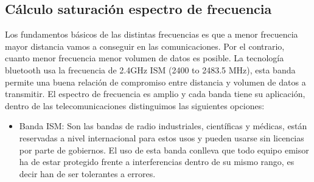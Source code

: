\documentclass[a4paper ,12pt, onecolumn]{article}
\begin{document}
    \subsection{Cálculo saturación espectro de frecuencia}
            Los fundamentos básicos de las distintas frecuencias es que a menor frecuencia mayor distancia vamos a conseguir 
            en las comunicaciones. Por el contrario, cuanto menor frecuencia menor volumen de datos es posible.
            La tecnología bluetooth usa la frecuencia de 2.4GHz ISM (2400 to 2483.5 MHz), esta banda permite una buena relación
            de compromiso entre distancia y volumen de datos a transmitir.
            El espectro de frecuencia es amplio y cada banda tiene su aplicación, dentro de las telecomunicaciones
            distinguimos las siguientes opciones:
            \begin{itemize}
                \item Banda ISM: Son las bandas de radio industriales, científicas y médicas, están reservadas a 
                nivel internacional para estos usos y pueden usarse sin licencias por parte de gobiernos. El uso de esta
                banda conlleva que todo equipo emisor ha de estar protegido frente a interferencias dentro de su mismo 
                rango, es decir han de ser tolerantes a errores.
    

\end{itemize}
\end{document}
